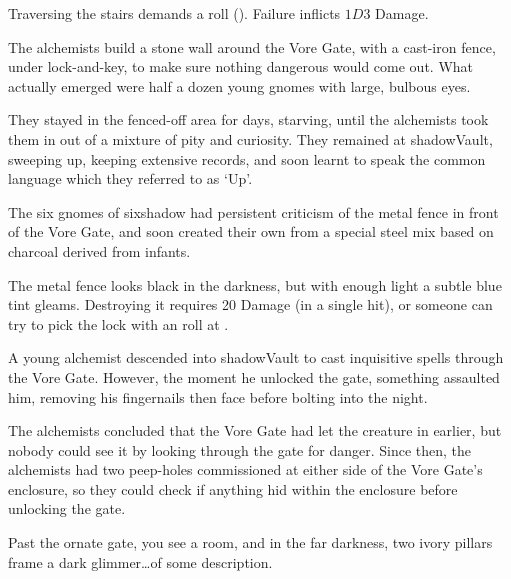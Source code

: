 \begin{multicols}{2}
Traversing the stairs demands a  roll (\tn[8]).
Failure inflicts $1D3$ Damage.



\begin{exampletext}
  The alchemists build a stone wall around the Vore Gate, with a cast-iron fence, under lock-and-key, to make sure nothing dangerous would come out.
  What actually emerged were half a dozen young gnomes with large, bulbous eyes.

  They stayed in the fenced-off area for days, starving, until the alchemists took them in out of a mixture of pity and curiosity.
  They remained at \gls{shadowVault}, sweeping up, keeping extensive records, and soon learnt to speak the common language which they referred to as `Up'.

  The six gnomes of \gls{sixshadow} had persistent criticism of the metal fence in front of the Vore Gate, and soon created their own from a special steel mix based on charcoal derived from  infants.
\end{exampletext}

The metal fence looks black in the darkness, but with enough light a subtle blue tint gleams.
Destroying it requires 20 Damage (in a single hit), or someone can try to pick the lock with an  roll at \tn[16].

\shadowVaultMap


\begin{exampletext}
  A young alchemist descended into \gls{shadowVault} to cast inquisitive spells through the Vore Gate.
  However, the moment he unlocked the gate, something assaulted him, removing his fingernails then face before bolting into the night.

  The alchemists concluded that the Vore Gate had let the creature in earlier, but nobody could see it by looking through the gate for danger.
  Since then, the alchemists had two peep-holes commissioned at either side of the Vore Gate's enclosure, so they could check if anything hid within the enclosure before unlocking the gate.
\end{exampletext}

\begin{boxtext}
  Past the ornate gate, you see a room, and in the far darkness, two ivory pillars frame a dark glimmer\ldots of some description.
\end{boxtext}


\end{multicols}
